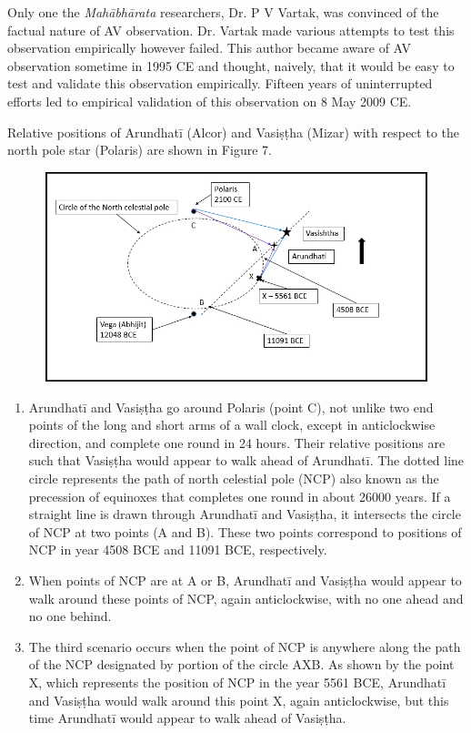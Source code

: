 Only one the \textit{Mahābhārata} researchers, Dr. P V Vartak, was convinced of the factual nature of AV observation. Dr. Vartak made various attempts to test this observation empirically however failed. This author became aware of AV observation sometime in 1995 CE and thought, naively, that it would be easy to test and validate this observation empirically. Fifteen years of uninterrupted efforts led to empirical validation of this observation on 8 May 2009 CE.

Relative positions of Arundhatī (Alcor) and Vasiṣṭha (Mizar) with respect to the north pole star (Polaris) are shown in Figure 7.

\begin{figure}[!h]
\includegraphics[scale=.3]{images/chap2-8.jpg}
\caption{}\label{chap1-fig7}
\end{figure}

\begin{enumerate}
\itemsep=0pt
\item Arundhatī and Vasiṣṭha go around Polaris (point C), not unlike two end points of the long and short arms of a wall clock, except in anticlockwise direction, and complete one round in 24 hours. Their relative positions are such that Vasiṣṭha would appear to walk ahead of Arundhatī. The dotted line circle represents the path of north celestial pole (NCP) also known as the precession of equinoxes that completes one round in about 26000 years. If a straight line is drawn through Arundhatī and Vasiṣṭha, it intersects the circle of NCP at two points (A and B). These two points correspond to positions of NCP in year 4508 BCE and 11091 BCE, respectively.

 \item When points of NCP are at A or B, Arundhatī and Vasiṣṭha would appear to walk around these points of NCP, again anticlockwise, with no one ahead and no one behind.

 \item The third scenario occurs when the point of NCP is anywhere along the path of the NCP designated by portion of the circle AXB. As shown by the point X, which represents the position of NCP in the year 5561 BCE, Arundhatī and Vasiṣṭha would walk around this point X, again anticlockwise, but this time Arundhatī would appear to walk ahead of Vasiṣṭha.

\end{enumerate}

